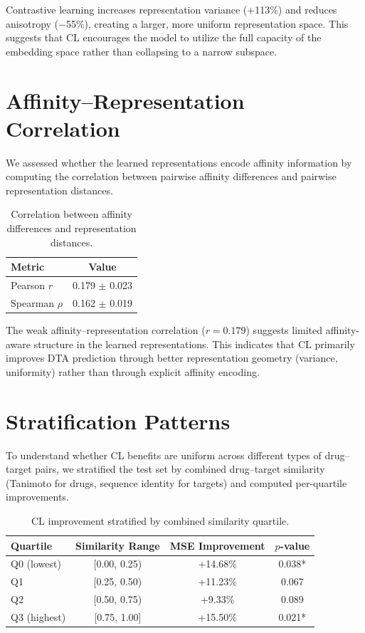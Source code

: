 \documentclass[10pt,a4paper]{article}
\begin{document}
Contrastive learning increases representation variance (+113\%) and reduces anisotropy ($-$55\%), creating a larger, more uniform representation space. This suggests that CL encourages the model to utilize the full capacity of the embedding space rather than collapsing to a narrow subspace.

\section{Affinity--Representation Correlation}

We assessed whether the learned representations encode affinity information by computing the correlation between pairwise affinity differences and pairwise representation distances.

\begin{table}[!h]
\caption{Correlation between affinity differences and representation distances.}
\label{tab:affinity_correlation}
\centering
\begin{tabular}{lc}
\toprule
Metric & Value \\
\midrule
Pearson $r$ & 0.179 $\pm$ 0.023 \\
Spearman $\rho$ & 0.162 $\pm$ 0.019 \\
\bottomrule
\end{tabular}
\end{table}

The weak affinity--representation correlation ($r = 0.179$) suggests limited affinity-aware structure in the learned representations. This indicates that CL primarily improves DTA prediction through better representation geometry (variance, uniformity) rather than through explicit affinity encoding.

\section{Stratification Patterns}

To understand whether CL benefits are uniform across different types of drug--target pairs, we stratified the test set by combined drug--target similarity (Tanimoto for drugs, sequence identity for targets) and computed per-quartile improvements.

\begin{table}[!h]
\caption{CL improvement stratified by combined similarity quartile.}
\label{tab:stratification_similarity}
\centering
\begin{tabular}{lccc}
\toprule
Quartile & Similarity Range & MSE Improvement & $p$-value \\
\midrule
Q0 (lowest) & [0.00, 0.25) & +14.68\% & 0.038* \\
Q1 & [0.25, 0.50) & +11.23\% & 0.067 \\
Q2 & [0.50, 0.75) & +9.33\% & 0.089 \\
Q3 (highest) & [0.75, 1.00] & +15.50\% & 0.021* \\
\bottomrule
\end{tabular}
\end{table}
\end{document}
